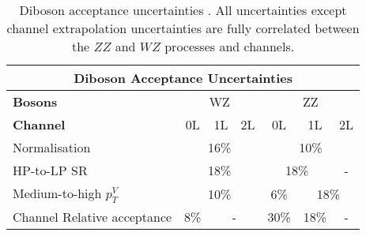 \begin{table}[!htbp] 
    \footnotesize\centering
    \setlength{\tabcolsep}{0.5em} %
    \begin{tabular}{l|c|c|c|c|c|c}
    \toprule\hline
    \multicolumn{7}{c}{Diboson Acceptance Uncertainties}            
    \\ \hline
    \textbf{Bosons}     & \multicolumn{3}{c|}{{WZ}} & \multicolumn{3}{c}{{ZZ}} 
    \\ \hline
    \textbf{Channel}    &   0L      &   1L    &   2L    &   0L      &   1L      & 2L          
    \\ \hline
    Normalisation       &  \multicolumn{3}{c|}{{16\%}}    &  \multicolumn{3}{c}{{10\%}}
    \\ \hline
    HP-to-LP SR               &   \multicolumn{3}{c|}{{18\%}}   &   \multicolumn{2}{c|}{{18\%}}    &   -      
    \\ \hline
    Medium-to-high $p_T^V$    &    \multicolumn{3}{c|}{{10\%}}     &    6\%    &    \multicolumn{2}{c}{{18\%}}
    \\ \hline
    Channel Relative acceptance     &   8\%    &   \multicolumn{2}{c|}{ - }     &    30\%      &    18\%      &   -
    \\ \hline\bottomrule
    \end{tabular}
    \caption{Diboson acceptance uncertainties \cite{Dao:2688371}. All uncertainties except channel extrapolation uncertainties are fully correlated between the $ZZ$ and $WZ$ processes and channels.}
    \label{tab:diboson_acceptance_uncerts}
\end{table}
        